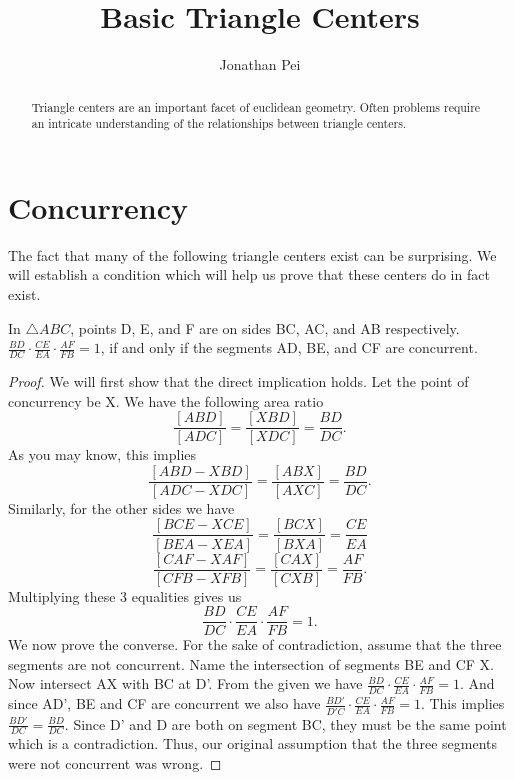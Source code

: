 \documentclass[11pt]{scrartcl}
\theoremstyle{plain}
\begin{document}
\title{Basic Triangle Centers}
\author{Jonathan Pei}
\subtitle{}
\maketitle

\begin{abstract}
    Triangle centers are an important facet of euclidean geometry.
    Often problems require an intricate understanding of the relationships between triangle centers.
\end{abstract}
\newpage
\tableofcontents
\newpage
\section{Concurrency}
    The fact that many of the following triangle centers exist can be surprising. We will establish a condition which will help us prove that these centers do in fact exist.
        \begin{theorem}[Ceva's] 
            In $\triangle ABC$, points D, E, and F are on sides BC, AC, and AB respectively. $\frac{BD}{DC}\cdot \frac{CE}{EA}\cdot\frac{AF}{FB} = 1$, if and only if the segments AD, BE, and CF are concurrent.
            
        \end{theorem}
        
    \begin{proof}
        We will first show that the direct implication holds. Let the point of concurrency be X. We have the following area ratio 
        $$\frac{[ABD]}{[ADC]} = \frac{[XBD]}{[XDC]}=\frac{BD}{DC}.$$
        As you may know, this implies $$\frac{[ABD-XBD]}{[ADC-XDC]}=\frac{[ABX]}{[AXC]}=\frac{BD}{DC}.$$
        Similarly, for the other sides we have 
        $$\frac{[BCE-XCE]}{[BEA-XEA]}=\frac{[BCX]}{[BXA]}=\frac{CE}{EA}$$
        $$\frac{[CAF-XAF]}{[CFB-XFB]}=\frac{[CAX]}{[CXB]}=\frac{AF}{FB}.$$
        Multiplying these 3 equalities gives us 
        $$\frac{BD}{DC}\cdot \frac{CE}{EA}\cdot\frac{AF}{FB} = 1.$$
        We now prove the converse. For the sake of contradiction, assume that the three segments are not concurrent.
        Name the intersection of segments BE and CF X. Now intersect AX with BC at D'. From the given we have $\frac{BD}{DC}\cdot \frac{CE}{EA}\cdot\frac{AF}{FB} = 1.$
        And since AD', BE and CF are concurrent we also have $\frac{BD'}{D'C}\cdot \frac{CE}{EA}\cdot\frac{AF}{FB} = 1.$
        This implies $\frac{BD'}{DC}=\frac{BD}{DC}$. Since D' and D are both on segment BC, they must be the same point which is a contradiction. Thus, our original assumption 
        that the three segments were not concurrent was wrong.
    \end{proof} 
 
\end{document}
